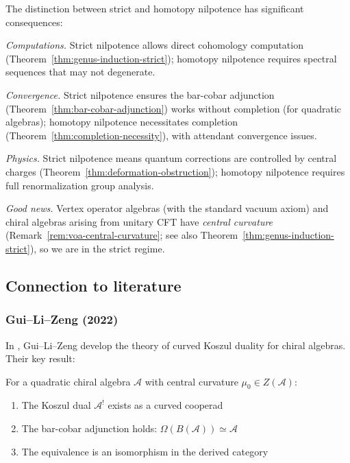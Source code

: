 \begin{remark}\label{rem:why-strict-matters}
The distinction between strict and homotopy nilpotence has significant consequences:

\emph{Computations.}
Strict nilpotence allows direct cohomology computation (Theorem~\ref{thm:genus-induction-strict}); homotopy nilpotence requires spectral sequences that may not degenerate.

\emph{Convergence.}
Strict nilpotence ensures the bar-cobar adjunction (Theorem~\ref{thm:bar-cobar-adjunction}) works without completion (for quadratic algebras); homotopy nilpotence necessitates completion (Theorem~\ref{thm:completion-necessity}), with attendant convergence issues.

\emph{Physics.}
Strict nilpotence means quantum corrections are controlled by central charges (Theorem~\ref{thm:deformation-obstruction}); homotopy nilpotence requires full renormalization group analysis.

\emph{Good news.} Vertex operator algebras (with the standard vacuum axiom) and
chiral algebras arising from unitary CFT have \emph{central curvature}
(Remark~\ref{rem:voa-central-curvature}; see also Theorem~\ref{thm:genus-induction-strict}), so we are in the strict regime.
\end{remark}

\subsection{Connection to literature}

\subsubsection{Gui--Li--Zeng (2022)}

In \cite{GLZ22}, Gui--Li--Zeng develop the theory of curved Koszul duality for chiral algebras. 
Their key result:

\begin{theorem}\label{thm:glz-curved}
For a quadratic chiral algebra $\mathcal{A}$ with central curvature $\mu_0 \in Z(\mathcal{A})$:
\begin{enumerate}
\item The Koszul dual $\mathcal{A}^!$ exists as a curved cooperad
\item The bar-cobar adjunction holds: $\Omega(B(\mathcal{A})) \simeq \mathcal{A}$
\item The equivalence is an isomorphism in the derived category
\end{enumerate}
\end{theorem}

